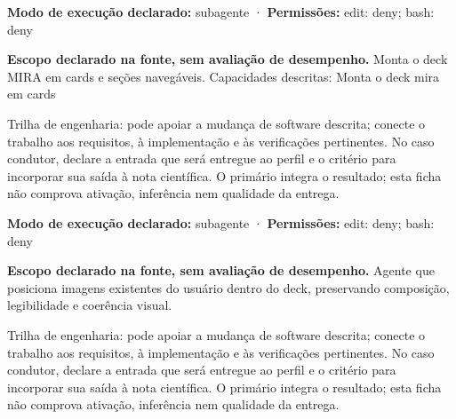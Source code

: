 \begin{arquitetura}
\textbf{Modo de execução declarado:} subagente · \textbf{Permissões:} edit: deny; bash: deny
\end{arquitetura}


\begin{descricao}
\textbf{Escopo declarado na fonte, sem avaliação de desempenho.}
Monta o deck MIRA em cards e seções navegáveis. Capacidades descritas: Monta o deck mira em cards
\end{descricao}

\begin{funcao}
Trilha de engenharia: pode apoiar a mudança de software descrita; conecte o trabalho aos requisitos, à implementação e às verificações pertinentes. No caso condutor, declare a entrada que será entregue ao perfil e o critério para incorporar sua saída à nota científica. O primário integra o resultado; esta ficha não comprova ativação, inferência nem qualidade da entrega.
\end{funcao}

\begin{arquitetura}
\textbf{Modo de execução declarado:} subagente · \textbf{Permissões:} edit: deny; bash: deny
\end{arquitetura}


\begin{descricao}
\textbf{Escopo declarado na fonte, sem avaliação de desempenho.}
Agente que posiciona imagens existentes do usuário dentro do deck, preservando composição, legibilidade e coerência visual.
\end{descricao}

\begin{funcao}
Trilha de engenharia: pode apoiar a mudança de software descrita; conecte o trabalho aos requisitos, à implementação e às verificações pertinentes. No caso condutor, declare a entrada que será entregue ao perfil e o critério para incorporar sua saída à nota científica. O primário integra o resultado; esta ficha não comprova ativação, inferência nem qualidade da entrega.
\end{funcao}

